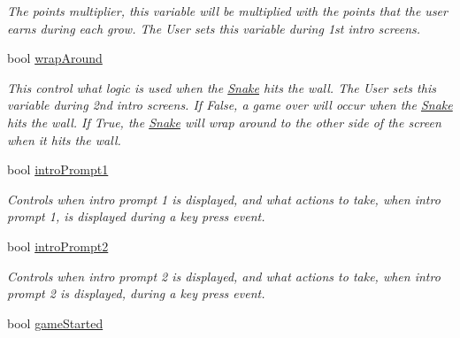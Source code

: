 \begin{DoxyCompactItemize}
\begin{DoxyCompactList}\small\item\em \-The points multiplier, this variable will be multiplied with the points that the user earns during each grow. \-The \-User sets this variable during 1st intro screens. \end{DoxyCompactList}\item 
\hypertarget{classGame_af942acedb59e3d6a9a57565f28aa312d}{bool \hyperlink{classGame_af942acedb59e3d6a9a57565f28aa312d}{wrap\-Around}}\label{classGame_af942acedb59e3d6a9a57565f28aa312d}

\begin{DoxyCompactList}\small\item\em \-This control what logic is used when the \hyperlink{classSnake}{\-Snake} hits the wall. \-The \-User sets this variable during 2nd intro screens. \-If \-False, a game over will occur when the \hyperlink{classSnake}{\-Snake} hits the wall. \-If \-True, the \hyperlink{classSnake}{\-Snake} will wrap around to the other side of the screen when it hits the wall. \end{DoxyCompactList}\item 
\hypertarget{classGame_a5dc3b4a5881de404704396843f240407}{bool \hyperlink{classGame_a5dc3b4a5881de404704396843f240407}{intro\-Prompt1}}\label{classGame_a5dc3b4a5881de404704396843f240407}

\begin{DoxyCompactList}\small\item\em \-Controls when intro prompt 1 is displayed, and what actions to take, when intro prompt 1, is displayed during a key press event. \end{DoxyCompactList}\item 
\hypertarget{classGame_aff3156d47d93ce108ee1d25da3ceea3c}{bool \hyperlink{classGame_aff3156d47d93ce108ee1d25da3ceea3c}{intro\-Prompt2}}\label{classGame_aff3156d47d93ce108ee1d25da3ceea3c}

\begin{DoxyCompactList}\small\item\em \-Controls when intro prompt 2 is displayed, and what actions to take, when intro prompt 2 is displayed, during a key press event. \end{DoxyCompactList}\item 
\hypertarget{classGame_af3d6a9c87d9278503529d5b62dba4077}{bool \hyperlink{classGame_af3d6a9c87d9278503529d5b62dba4077}{game\-Started}}\label{classGame_af3d6a9c87d9278503529d5b62dba4077}


\end{DoxyCompactItemize}
